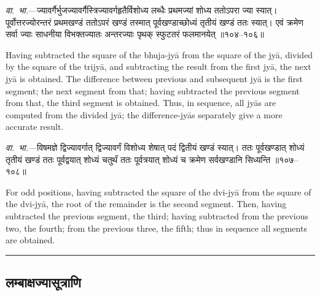 \documentclass[11pt,a4paper]{article}
\newcommand{\longline}{\noindent\rule{\textwidth}{0.4pt}}
\newcommand{\dev}[1]{{\devanagarifont #1}}
\newcommand{\sectsep}{\par\vspace{0.8em}\longline\vspace{0.8em}}
\begin{document}
\vspace{0.5em}
\begin{minipage}[t]{0.48\textwidth}
\small\devanagarifont
\textit{वा.~भा.}---ज्यावर्गैर्भुजज्यावर्गैस्त्रिज्यावर्गहृतैर्विशोध्य लब्धैः प्रथमज्यां शोध्य ततोऽपरा ज्या स्यात्। पूर्वोत्तरज्योरन्तरं प्रथमखण्डं ततोऽपरं खण्डं तस्मात् पूर्वखण्डाच्छोध्यं तृतीयं खण्डं ततः स्यात्। एवं क्रमेण सर्वा ज्याः साधनीया विभक्तज्यातः अन्तरज्याः पृथक् स्फुटतरं फलमानयेत् ॥१०४--१०६॥
\end{minipage}%
\hfill
\begin{minipage}[t]{0.48\textwidth}
\small
Having subtracted the square of the bhuja-jy\=a from the square of the jy\=a, divided by the square of the trijy\=a, and subtracting the result from the first jy\=a, the next jy\=a is obtained. The difference between previous and subsequent jy\=a is the first segment; the next segment from that; having subtracted the previous segment from that, the third segment is obtained. Thus, in sequence, all jy\=as are computed from the divided jy\=a; the difference-jy\=as separately give a more accurate result.
\end{minipage}

\vspace{0.5em}
\begin{minipage}[t]{0.48\textwidth}
\small\devanagarifont
\textit{वा.~भा.}---विषमज्ञे द्विज्यावर्गात् द्विज्यावर्गं विशोध्य शेषात् पदं द्वितीयं खण्डं स्यात्। ततः पूर्वखण्डात् शोध्यं तृतीयं खण्डं ततः पूर्वद्वयात् शोध्यं चतुर्थं ततः पूर्वत्रयात् शोध्यं च क्रमेण सर्वखण्डानि सिध्यन्ति ॥१०७--१०८॥
\end{minipage}%
\hfill
\begin{minipage}[t]{0.48\textwidth}
\small
For odd positions, having subtracted the square of the dvi-jy\=a from the square of the dvi-jy\=a, the root of the remainder is the second segment. Then, having subtracted the previous segment, the third; having subtracted from the previous two, the fourth; from the previous three, the fifth; thus in sequence all segments are obtained.
\end{minipage}

\sectsep

\subsection{\dev{लम्बाक्षज्यासूत्राणि}}
\end{document}
